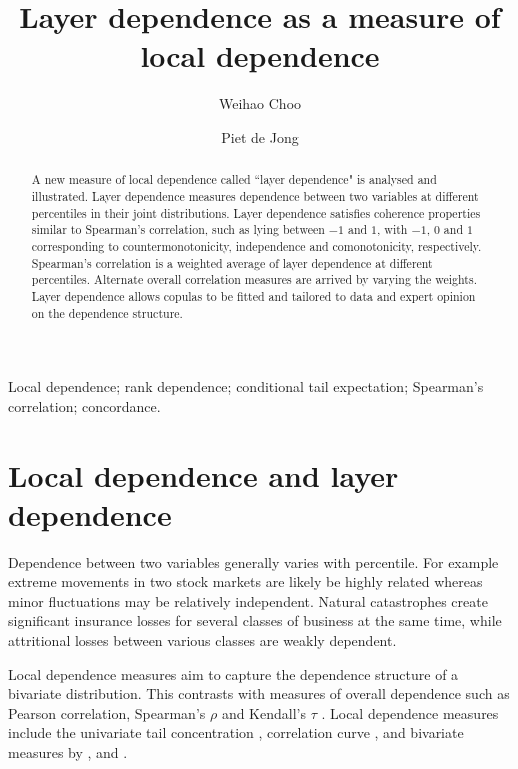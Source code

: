 \documentclass[authoryear]{elsarticle}
\begin{document}
\begin{frontmatter}

\title{Layer dependence as a measure of local dependence}
\author[acst]{Weihao Choo}
\author[acst]{Piet de Jong}



\address[acst]{Department of Applied Finance and Actuarial Studies Macquarie
University, NSW 2109, Australia.}




\begin{abstract}
A new measure of local dependence called  ``layer dependence" is analysed and illustrated.  Layer dependence measures dependence between two variables at different percentiles in their joint distributions. Layer dependence satisfies coherence properties similar to Spearman's correlation, such as lying between $-1$ and $1$, with $-1$, $0$ and $1$ corresponding to countermonotonicity, independence and comonotonicity, respectively. Spearman's correlation is  a weighted average of layer dependence at different percentiles.  Alternate overall correlation measures are arrived by varying the weights.  Layer dependence allows copulas to be  fitted and tailored to data and expert opinion on the dependence structure.
\end{abstract}

\begin{keyword}
Local dependence; rank dependence; conditional tail expectation; Spearman's correlation; concordance.
\end{keyword}



\end{frontmatter}

\section{Local dependence and layer dependence}

Dependence between two variables generally varies  with percentile. For example extreme movements in two stock markets are likely be highly related  whereas minor fluctuations may be relatively independent. Natural catastrophes create significant insurance losses for several classes of business at the same time, while attritional losses between various classes are weakly dependent.


Local dependence measures aim to capture the dependence structure of a bivariate distribution. This contrasts with  measures of overall dependence such as Pearson correlation, Spearman's $\rho$ and Kendall's $\tau$ \citep{embrechts2002correlation}. Local dependence measures include the univariate tail concentration \citep{venter2002tails}, correlation curve \citep{bjerve1993correlation}, and bivariate measures by \cite{bairamov2003new}, \cite{jones1996local} and \cite{holland1987dependence}.
\end{document}
